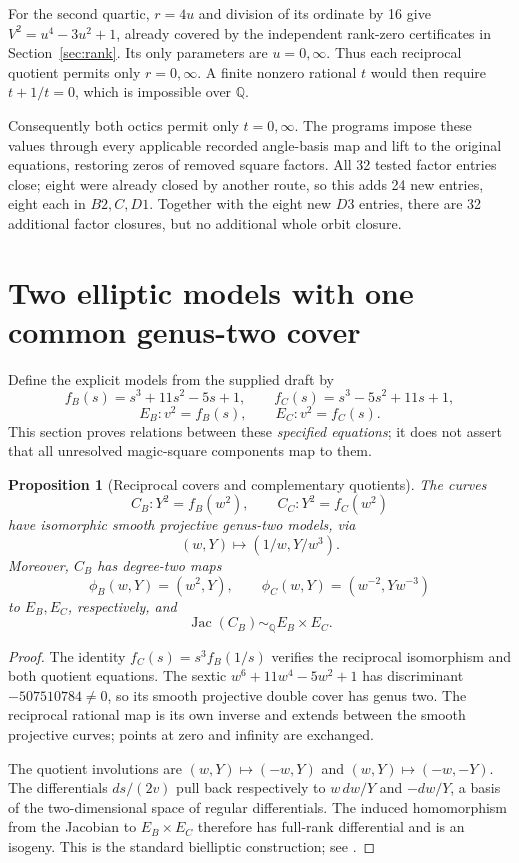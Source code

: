 \documentclass[11pt,letterpaper]{article}
\newtheorem{proposition}[theorem]{Proposition}
\theoremstyle{definition}\newtheorem{definition}[theorem]{Definition}
\theoremstyle{remark}\newtheorem{remark}[theorem]{Remark}
\newcommand{\Q}{\mathbb Q}\newcommand{\Z}{\mathbb Z}\newcommand{\R}{\mathbb R}
\newcommand{\Jac}{\operatorname{Jac}}\newcommand{\Res}{\operatorname{Res}}
\begin{document}
For the second quartic, $r=4u$ and division of its ordinate by 16 give $V^2=u^4-3u^2+1$, already covered by the independent rank-zero certificates in Section~\ref{sec:rank}. Its only parameters are $u=0,\infty$. Thus each reciprocal quotient permits only $r=0,\infty$. A finite nonzero rational $t$ would then require $t+1/t=0$, which is impossible over $\Q$.

Consequently both octics permit only $t=0,\infty$. The programs impose these values through every applicable recorded angle-basis map and lift to the original equations, restoring zeros of removed square factors. All 32 tested factor entries close; eight were already closed by another route, so this adds 24 new entries, eight each in $B2,C,D1$. Together with the eight new $D3$ entries, there are 32 additional factor closures, but no additional whole orbit closure.

\section{Two elliptic models with one common genus-two cover}\label{sec:curves}
Define the explicit models from the supplied draft by
\[
f_B(s)=s^3+11s^2-5s+1,\qquad f_C(s)=s^3-5s^2+11s+1,
\]
\[
E_B:v^2=f_B(s),\qquad E_C:v^2=f_C(s).
\]
This section proves relations between these \emph{specified equations}; it does not assert that all unresolved magic-square components map to them.

\begin{proposition}[Reciprocal covers and complementary quotients]\label{prop:BC}
The curves
\[
C_B:Y^2=f_B(w^2),\qquad C_C:Y^2=f_C(w^2)
\]
have isomorphic smooth projective genus-two models, via
\[
(w,Y)\longmapsto(1/w,Y/w^3).
\]
Moreover, $C_B$ has degree-two maps
\[
\phi_B(w,Y)=(w^2,Y),\qquad
\phi_C(w,Y)=(w^{-2},Yw^{-3})
\]
to $E_B,E_C$, respectively, and
\[
\Jac(C_B)\sim_\Q E_B\times E_C.
\]
\end{proposition}
\begin{proof}
The identity $f_C(s)=s^3f_B(1/s)$ verifies the reciprocal isomorphism and both quotient equations. The sextic $w^6+11w^4-5w^2+1$ has discriminant $-507510784\ne0$, so its smooth projective double cover has genus two. The reciprocal rational map is its own inverse and extends between the smooth projective curves; points at zero and infinity are exchanged.

The quotient involutions are $(w,Y)\mapsto(-w,Y)$ and $(w,Y)\mapsto(-w,-Y)$. The differentials $ds/(2v)$ pull back respectively to $w\,dw/Y$ and $-dw/Y$, a basis of the two-dimensional space of regular differentials. The induced homomorphism from the Jacobian to $E_B\times E_C$ therefore has full-rank differential and is an isogeny. This is the standard bielliptic construction; see \cite[Section 2]{BP}.
\end{proof}
\end{document}
